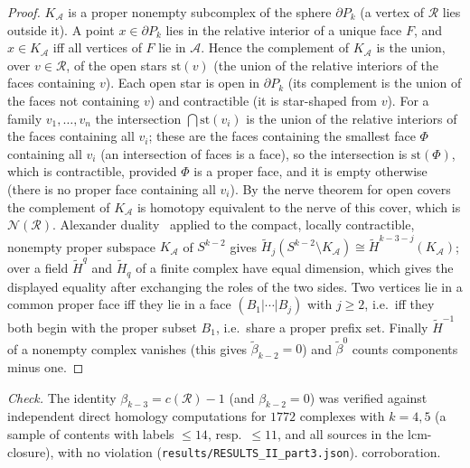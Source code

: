 \begin{proof}
$K_{\mathcal A}$ is a proper nonempty subcomplex of the sphere $\partial P_k$ (a vertex of $\mathcal R$ lies outside it). A point $x\in\partial P_k$ lies in the relative interior of a unique face $F$, and $x\in K_{\mathcal A}$ iff all vertices of $F$ lie in $\mathcal A$. Hence the complement of $K_{\mathcal A}$ is the union, over $v\in\mathcal R$, of the open stars $\mathrm{st}(v)$ (the union of the relative interiors of the faces containing $v$). Each open star is open in $\partial P_k$ (its complement is the union of the faces not containing $v$) and contractible (it is star-shaped from $v$). For a family $v_1,\dots,v_n$ the intersection $\bigcap\mathrm{st}(v_i)$ is the union of the relative interiors of the faces containing all $v_i$; these are the faces containing the smallest face $\Phi$ containing all $v_i$ (an intersection of faces is a face), so the intersection is $\mathrm{st}(\Phi)$, which is contractible, provided $\Phi$ is a proper face, and it is empty otherwise (there is no proper face containing all $v_i$). By the nerve theorem for open covers~\cite[Cor.~4G.3]{Hatcher2002} the complement of $K_{\mathcal A}$ is homotopy equivalent to the nerve of this cover, which is $\mathcal N(\mathcal R)$. Alexander duality~\cite[Prop.~3.46]{Hatcher2002} applied to the compact, locally contractible, nonempty proper subspace $K_{\mathcal A}$ of $S^{k-2}$ gives $\tilde H_j(S^{k-2}\setminus K_{\mathcal A})\cong\tilde H^{k-3-j}(K_{\mathcal A})$; over a field $\tilde H^q$ and $\tilde H_q$ of a finite complex have equal dimension, which gives the displayed equality after exchanging the roles of the two sides. Two vertices lie in a common proper face iff they lie in a face $(B_1|\cdots|B_j)$ with $j\ge2$, i.e.\ iff they both begin with the proper subset $B_1$, i.e.\ share a proper prefix set. Finally $\tilde H^{-1}$ of a nonempty complex vanishes (this gives $\tilde\beta_{k-2}=0$) and $\tilde\beta^0$ counts components minus one.
\end{proof}
\emph{Check.} The identity $\beta_{k-3}=c(\mathcal R)-1$ (and $\beta_{k-2}=0$) was verified against independent direct homology computations for $1772$ complexes with $k=4,5$ (a sample of contents with labels $\le14$, resp.\ $\le11$, and all sources in the lcm-closure), with no violation (\texttt{results/RESULTS\_II\_part3.json}).  corroboration.

